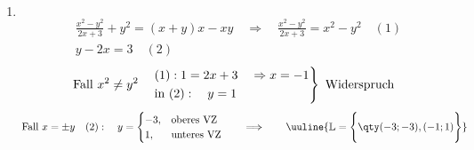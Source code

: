 \begin{enumerate}[label=(\alph*)]
    \item $~$\\[-1.45cm]
    \begin{align*}
        &\frac{x^2-y^2}{2x+3}+y^2=(x+y)x-xy \quad \Rightarrow \quad \frac{x^2 -y^2}{2x+3} = x^2 - y^2\quad(1) \\
        &y-2x=3 \quad (2)
    \end{align*}
    \begin{align*}
        \text{Fall } x^2 \neq y^2 \quad
        \begin{rcases}
            (1): 1=2x+3 \quad \Rightarrow x=-1 \\
            \text{in }(2): \quad y=1
        \end{rcases} \text{ Widerspruch}
    \end{align*}
    \begin{align*}
        \text{Fall } x = \pm y \quad (2): \quad y=
        \begin{cases}
            -3, &\text{oberes VZ}\\
            1, &\text{unteres VZ}
        \end{cases} \qquad \Longrightarrow \qquad \uuline{\mathbb{L} = \Bigg\{\qty(-3;-3),(-1;1)\Bigg\}}
    \end{align*}
\end{enumerate}

\newpage
